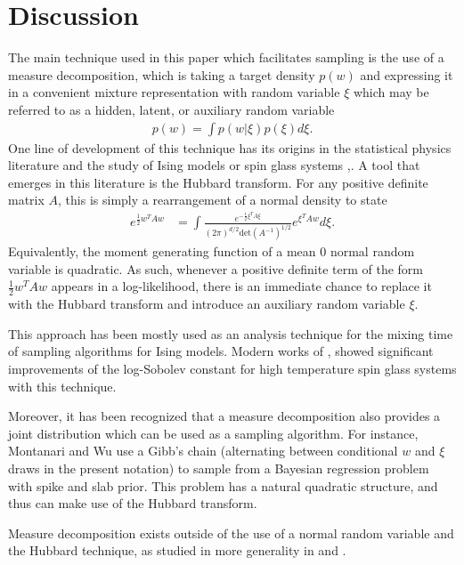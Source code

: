 \documentclass{article}
\numberwithin{equation}{section}
\theoremstyle{Lemma}
\theoremstyle{Corollary}
\theoremstyle{Theorem}
\theoremstyle{Remark}
\begin{document}
\section{Discussion}\label{discussion}

The main technique used in this paper which facilitates sampling is the use of a measure decomposition, which is taking a target density $p(w)$ and expressing it in a convenient mixture representation with random variable $\xi$ which may be referred to as a hidden, latent, or auxiliary random variable
\begin{align}
p(w) = \int p(w|\xi)p(\xi)d\xi.
\end{align}
One line of development of this technique has its origins in the statistical physics literature and the study of Ising models or spin glass systems \cite{baker1962certain},\cite{hubbard1972critical}. A tool that  emerges in this literature is the Hubbard transform. For any positive definite matrix $A$, this is simply a rearrangement of a normal density to state
\begin{align}
e^{\frac{1}{2}w^{T}Aw}&= \int \frac{e^{-\frac{1}{2} \xi^{T}A\xi}}{(2\pi)^{d/2} \text{det}(A^{-1})^{1/2}}e^{\xi^{T}A w }d\xi.
\end{align}
Equivalently, the moment generating function of a mean 0 normal random variable is quadratic. As such, whenever a positive definite term of the form $\frac{1}{2}w^{T}Aw$ appears in a log-likelihood, there is an immediate chance to replace it with the Hubbard transform and introduce an auxiliary random variable $\xi$.

This approach has been mostly used as an analysis technique for the mixing time of sampling algorithms for Ising models. Modern works of \cite{bauerschmidt2019very}, \cite{eldan2022spectral} showed significant improvements of the log-Sobolev constant for high temperature spin glass systems with this technique.

Moreover, it has been recognized that a measure decomposition also provides a joint distribution which can be used as a sampling algorithm. For instance, Montanari and Wu \cite{montanari2024provably} use a Gibb’s chain (alternating between conditional $w$ and $\xi$ draws in the present notation) to sample from a Bayesian regression problem with spike and slab prior. This problem has a natural quadratic structure, and thus can make use of the Hubbard transform.

Measure decomposition exists outside of the use of a normal random variable and the Hubbard technique, as studied in more generality in \cite{eldan2018decomposition} and \cite{eldan2020taming}.
\end{document}
